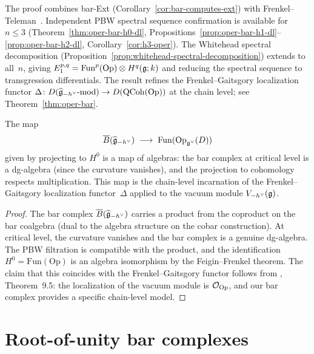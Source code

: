 \begin{remark}
\label{rem:oper-evidence}
The proof combines bar-Ext (Corollary~\ref{cor:bar-computes-ext})
with Frenkel--Teleman~\cite{FT06}.  Independent PBW spectral
sequence confirmation is available for $n \leq 3$
(Theorem~\ref{thm:oper-bar-h0-dl},
Propositions~\ref{prop:oper-bar-h1-dl}--\ref{prop:oper-bar-h2-dl},
Corollary~\ref{cor:h3-oper}).  The Whitehead spectral decomposition
(Proposition~\ref{prop:whitehead-spectral-decomposition}) extends
to all~$n$, giving
$E_1^{p,q} = \mathrm{Fun}^p(\mathrm{Op}) \otimes H^q(\mathfrak{g}; k)$
and reducing the spectral sequence to transgression differentials.
The result refines the Frenkel--Gaitsgory localization functor
$\Delta\colon D(\widehat{\mathfrak{g}}_{-h^\vee}\text{-}\mathrm{mod})
\to D(\mathrm{QCoh}(\mathrm{Op}))$
at the chain level; see Theorem~\ref{thm:oper-bar}.
\end{remark}

\begin{proposition}
\label{prop:bar-as-localization}
The map
\[
\overline{B}(\widehat{\mathfrak{g}}_{-h^\vee})
\;\longrightarrow\;
\mathrm{Fun}(\mathrm{Op}_{\mathfrak{g}^\vee}(D))
\]
given by projecting to $H^0$ is a map of algebras: the bar
complex at critical level is a dg-algebra (since the curvature
vanishes), and the projection to cohomology respects
multiplication.  This map is the chain-level incarnation of the
Frenkel--Gaitsgory localization functor~$\Delta$ applied to the
vacuum module $V_{-h^\vee}(\mathfrak{g})$.
\end{proposition}

\begin{proof}
The bar complex $\overline{B}(\widehat{\mathfrak{g}}_{-h^\vee})$ carries a product
from the coproduct on the bar coalgebra (dual to the algebra
structure on the cobar construction).  At critical level, the
curvature vanishes and the bar complex is a genuine dg-algebra.
The PBW filtration is compatible with the product, and the
identification $H^0 = \mathrm{Fun}(\mathrm{Op})$ is an algebra
isomorphism by the Feigin--Frenkel theorem.  The claim that this
coincides with the Frenkel--Gaitsgory functor follows from
\cite{FG06}, Theorem~9.5: the localization of the vacuum module
is $\mathcal{O}_{\mathrm{Op}}$, and our bar complex provides a specific
chain-level model.
\end{proof}



\section{Root-of-unity bar complexes}
\label{sec:root-of-unity}

